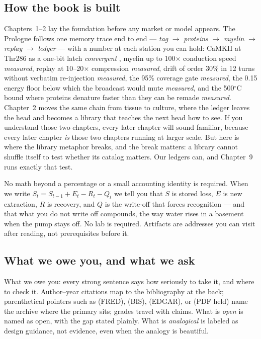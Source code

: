 \subsection*{How the book is built}

Chapters~1--2 lay the foundation before any market or model appears. The Prologue follows one memory trace end to end --- \textit{tag} $\to$ \textit{proteins} $\to$ \textit{myelin} $\to$ \textit{replay} $\to$ \textit{ledger} --- with a number at each station you can hold: CaMKII at Thr286 as a one-bit latch \textit{convergent} \citep{kandel2000}, myelin up to 100$\times$ conduction speed \textit{measured}, replay at 10--20$\times$ compression \textit{measured}, drift of order 30\% in 12 turns without verbatim re-injection \textit{measured}, the 95\% coverage gate \textit{measured}, the 0.15 energy floor below which the broadcast would mute \textit{measured}, and the 500$^\circ$C bound where proteins denature faster than they can be remade \textit{measured}. Chapter~2 moves the same chain from tissue to culture, where the ledger leaves the head and becomes a library that teaches the next head how to see. If you understand those two chapters, every later chapter will sound familiar, because every later chapter \textit{is} those two chapters running at larger scale. But here is where the library metaphor breaks, and the break matters: a library cannot shuffle itself to test whether its catalog matters. Our ledgers can, and Chapter~9 runs exactly that test.

No math beyond a percentage or a small accounting identity is required. When we write $S_t = S_{t-1} + E_t - R_t - Q_t$ we tell you that $S$ is stored loss, $E$ is new extraction, $R$ is recovery, and $Q$ is the write-off that forces recognition --- and that what you do not write off compounds, the way water rises in a basement when the pump stays off. No lab is required. Artifacts are addresses you can visit after reading, not prerequisites before it.

\subsection*{What we owe you, and what we ask}

What we owe you: every strong sentence says how seriously to take it, and where to check it. Author--year citations map to the bibliography at the back; parenthetical pointers such as (FRED), (BIS), (EDGAR), or (PDF held) name the archive where the primary sits; grades travel with claims. What is \textit{open} is named as open, with the gap stated plainly. What is \textit{analogical} is labeled as design guidance, not evidence, even when the analogy is beautiful.

